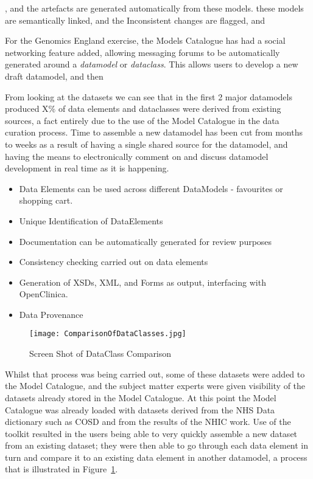  , and the artefacts are
generated automatically from these models. these models are
semantically linked, and the Inconsistent changes are flagged, and

For the Genomics England exercise, the Models Catalogue has had a
social networking feature added, allowing messaging forums to be
automatically generated around a \emph{datamodel} or
\emph{dataclass}. This allows users to develop a new draft datamodel,
and then

From looking at the datasets we can see that in the first 2 major
datamodels produced X\% of data elements and dataclasses were derived
from existing sources, a fact entirely due to the use of the Model
Catalogue in the data curation process. Time to assemble a new
datamodel has been cut from months to weeks as a result of having a
single shared source for the datamodel, and having the means to
electronically comment on and discuss datamodel development in real
time as it is happening.

\begin{itemize}
	\item Data Elements can be used across different DataModels - favourites or shopping cart.
	\item Unique Identification of DataElements 
	\item Documentation can be automatically generated for review purposes
	\item Consistency checking carried out on data elements
	\item Generation of XSDs, XML, and Forms as output, interfacing with OpenClinica.
	\item Data Provenance
\end{itemize}

\begin{figure}[here]
	\texttt{[image: ComparisonOfDataClasses.jpg]}
	\caption{Screen Shot of DataClass Comparison} 
	\label{fig:dataClassComparison}	
\end{figure}

Whilst that process was being carried out, some of these datasets were added to the Model Catalogue, and the subject matter experts were given visibility of the datasets already stored in the Model Catalogue. At this point the Model Catalogue was already loaded with datasets derived from the NHS Data dictionary such as COSD and from the results of the NHIC work. Use of the toolkit resulted in the users being able to very quickly assemble a new dataset from an existing dataset; they were then able to go through each data element in turn and compare it to an existing data element in another datamodel, a process that is illustrated in Figure~\ref{fig:dataClassComparison}.


